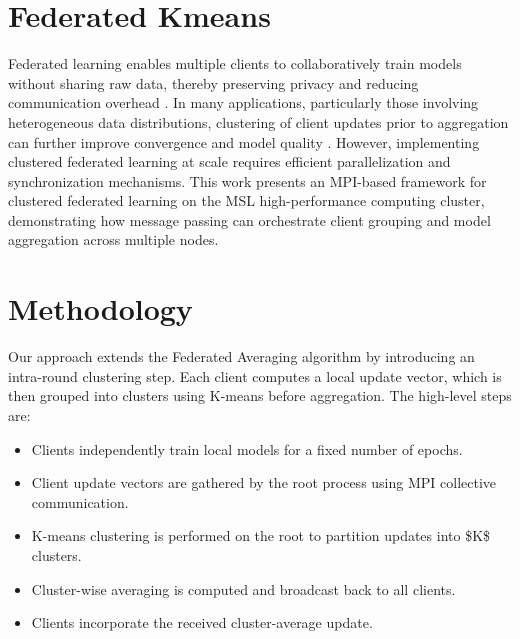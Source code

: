 \section{Federated Kmeans}

Federated learning enables multiple clients to collaboratively train models without sharing raw data, thereby preserving privacy and reducing communication overhead \cite{McMahan2017}. In many applications, particularly those involving heterogeneous data distributions, clustering of client updates prior to aggregation can further improve convergence and model quality \cite{Ghosh2020}. However, implementing clustered federated learning at scale requires efficient parallelization and synchronization mechanisms. This work presents an MPI-based framework for clustered federated learning on the MSL high-performance computing cluster, demonstrating how message passing can orchestrate client grouping and model aggregation across multiple nodes.

\section{Methodology}
Our approach extends the Federated Averaging algorithm by introducing an intra-round clustering step. Each client computes a local update vector, which is then grouped into clusters using K-means before aggregation. The high-level steps are:
\begin{itemize}
\item Clients independently train local models for a fixed number of epochs.
\item Client update vectors are gathered by the root process using MPI collective communication.
\item K-means clustering is performed on the root to partition updates into \$K\$ clusters.
\item Cluster-wise averaging is computed and broadcast back to all clients.
\item Clients incorporate the received cluster-average update.
\end{itemize}


